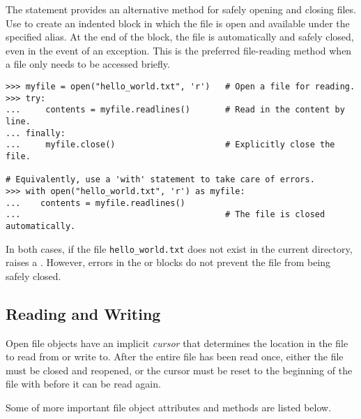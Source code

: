 The  statement provides an alternative method for safely opening and closing files.
Use  to create an indented block in which the file is open and available under the specified alias.
At the end of the block, the file is automatically and safely closed, even in the event of an exception.
This is the preferred file-reading method when a file only needs to be accessed briefly.

\begin{lstlisting}
>>> myfile = open("hello_world.txt", 'r')   # Open a file for reading.
>>> try:
...     contents = myfile.readlines()       # Read in the content by line.
... finally:
...     myfile.close()                      # Explicitly close the file.

# Equivalently, use a 'with' statement to take care of errors.
>>> with open("hello_world.txt", 'r') as myfile:
...    contents = myfile.readlines()
...                                         # The file is closed automatically.
\end{lstlisting}

In both cases, if the file \texttt{hello\_world.txt} does not exist in the current directory,  raises a .
However, errors in the  or  blocks do not prevent the file from being safely closed.

\subsection*{Reading and Writing} %

Open file objects have an implicit \emph{cursor} that determines the location in the file to read from or write to.
After the entire file has been read once, either the file must be closed and reopened, or the cursor must be reset to the beginning of the file with  before it can be read again.

Some of more important file object attributes and methods are listed below.

